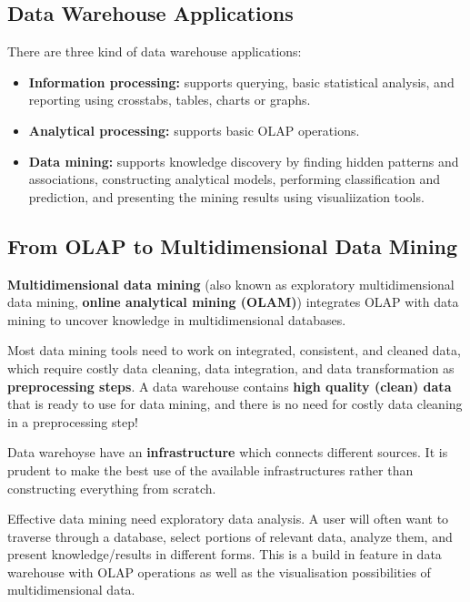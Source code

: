 	\subsection{Data Warehouse Applications}

		There are three kind of data warehouse applications:
		\begin{itemize}
			\item {\bf Information processing:} supports querying, basic statistical analysis,
			and reporting using crosstabs, tables, charts or graphs.
			\item {\bf Analytical processing:} supports basic OLAP operations.
			\item {\bf Data mining:} supports knowledge discovery by finding hidden patterns
			and associations, constructing analytical models, performing classification 
			and prediction, and presenting the mining results using visualiization tools. 
		\end{itemize}

	\subsection{From OLAP to Multidimensional Data Mining}

		{\bf Multidimensional data mining} (also known as exploratory multidimensional data mining,
		{\bf online analytical mining (OLAM)}) integrates OLAP with data mining to 
		uncover knowledge in multidimensional databases. 

		Most data mining tools need to work on integrated, consistent, and cleaned data, which
		require costly data cleaning, data integration, and data transformation as
		{\bf preprocessing steps}. A data warehouse contains {\bf high quality (clean) data} that is ready
		to use for data mining, and there is no need for costly data cleaning in a 
		preprocessing step!

		Data warehoyse have an {\bf infrastructure} which connects different sources. It
		is prudent to make the best use of the available infrastructures rather than constructing
		everything from scratch. 

		Effective data mining need exploratory data analysis. A user will often want to traverse
		through a database, select portions of relevant data, analyze them, and present
		knowledge/results in different forms. This is a build in feature in data warehouse
		with OLAP operations as well as the visualisation possibilities of multidimensional data.

